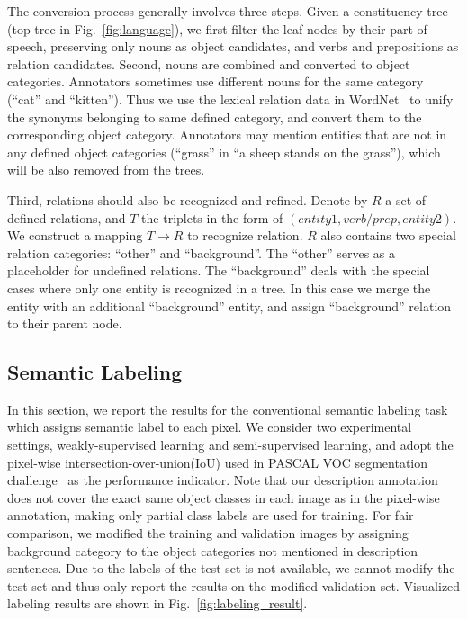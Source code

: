 \documentclass[10pt,twocolumn,letterpaper]{article}
\begin{document}
The conversion process generally involves three steps. Given a constituency tree (top tree in Fig.~\ref{fig:language}), we first filter the leaf nodes by their part-of-speech, preserving only nouns as object candidates, and verbs and prepositions as relation candidates. Second, nouns are combined and converted to object categories. Annotators sometimes use different nouns for the same category (\eg ``cat'' and ``kitten''). Thus we use the lexical relation data in WordNet~\cite{wordnet} to unify the synonyms belonging to same defined category, and convert them to the corresponding object category. Annotators may mention entities that are not in any defined object categories (\eg ``grass'' in ``a sheep stands on the grass''), which will be also removed from the trees.

Third, relations should also be recognized and refined. Denote by $R$ a set of defined relations, and $T$ the triplets in the form of $(entity1, verb/prep, entity2)$. We construct a mapping $T \rightarrow R$ to recognize relation. $R$ also contains two special relation categories: ``other'' and ``background''. The ``other'' serves as a placeholder for undefined relations. The ``background'' deals with the special cases where only one entity is recognized in a tree. In this case we merge the entity with an additional ``background'' entity, and assign ``background'' relation to their parent node.

\subsection{Semantic Labeling}
\label{sub:semantic_Labeling}

In this section, we report the results for the conventional semantic labeling task which assigns semantic label to each pixel. We consider two experimental settings, \ie weakly-supervised learning and semi-supervised learning, and adopt the pixel-wise intersection-over-union(IoU) used in PASCAL VOC segmentation challenge~\cite{pascal_voc} as the performance indicator. Note that our description annotation does not cover the exact same object classes in each image as in the pixel-wise annotation, making only partial class labels are used for training. For fair comparison, we modified the training and validation images by assigning background category to the object categories not mentioned in description sentences. Due to the labels of the test set is not available, we cannot modify the test set  and thus only report the results on the modified validation set. Visualized labeling results are shown in Fig.~\ref{fig:labeling_result}.
\end{document}
